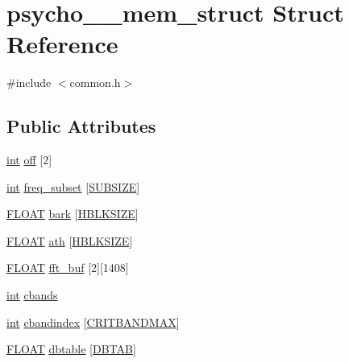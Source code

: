 \hypertarget{structpsycho__3__mem__struct}{}\section{psycho\+\_\+\_\+mem\+\_\+struct Struct Reference}
\label{structpsycho__3__mem__struct}


{\ttfamily \#include $<$common.\+h$>$}

\subsection*{Public Attributes}
\begin{DoxyCompactItemize}
\item 
\hyperlink{xmltok_8h_a5a0d4a5641ce434f1d23533f2b2e6653}{int} \hyperlink{structpsycho__3__mem__struct_acdb6dff0bf3ee7d04a3950b0173f5ff5}{off} \mbox{[}2\mbox{]}
\item 
\hyperlink{xmltok_8h_a5a0d4a5641ce434f1d23533f2b2e6653}{int} \hyperlink{structpsycho__3__mem__struct_ad1f171cd91c4a355096a36fa8a1fab97}{freq\+\_\+subset} \mbox{[}\hyperlink{twolame_2libtwolame_2common_8h_a13e3a47642545a9630ff3ef9e31c4521}{S\+U\+B\+S\+I\+ZE}\mbox{]}
\item 
\hyperlink{twolame_2libtwolame_2common_8h_ae8690abbffa85934d64d545920e2b108}{F\+L\+O\+AT} \hyperlink{structpsycho__3__mem__struct_a56c7889451c3574bfe6b1e77e9fbcc38}{bark} \mbox{[}\hyperlink{twolame_2libtwolame_2common_8h_a47a92e637e9159058c2f71d7c3999504}{H\+B\+L\+K\+S\+I\+ZE}\mbox{]}
\item 
\hyperlink{twolame_2libtwolame_2common_8h_ae8690abbffa85934d64d545920e2b108}{F\+L\+O\+AT} \hyperlink{structpsycho__3__mem__struct_adb99d8c4ffcf545625011df574e062bf}{ath} \mbox{[}\hyperlink{twolame_2libtwolame_2common_8h_a47a92e637e9159058c2f71d7c3999504}{H\+B\+L\+K\+S\+I\+ZE}\mbox{]}
\item 
\hyperlink{twolame_2libtwolame_2common_8h_ae8690abbffa85934d64d545920e2b108}{F\+L\+O\+AT} \hyperlink{structpsycho__3__mem__struct_a2371122a5a27f5f02b3e86701d4e43f9}{fft\+\_\+buf} \mbox{[}2\mbox{]}\mbox{[}1408\mbox{]}
\item 
\hyperlink{xmltok_8h_a5a0d4a5641ce434f1d23533f2b2e6653}{int} \hyperlink{structpsycho__3__mem__struct_aa44c1cab5f4660e0fe6398bfb27cb51b}{cbands}
\item 
\hyperlink{xmltok_8h_a5a0d4a5641ce434f1d23533f2b2e6653}{int} \hyperlink{structpsycho__3__mem__struct_a16a4ab0e46c2b4cbc2d61dd63f8285b3}{cbandindex} \mbox{[}\hyperlink{twolame_2libtwolame_2common_8h_a4b27b9b1dff4e446dd05112b6b940e5f}{C\+R\+I\+T\+B\+A\+N\+D\+M\+AX}\mbox{]}
\item 
\hyperlink{twolame_2libtwolame_2common_8h_ae8690abbffa85934d64d545920e2b108}{F\+L\+O\+AT} \hyperlink{structpsycho__3__mem__struct_a757825cf5dc16a8e8ce473fbf0081968}{dbtable} \mbox{[}\hyperlink{twolame_2libtwolame_2common_8h_a5b6a0dc416c04345a9ff28dce6948aff}{D\+B\+T\+AB}\mbox{]}
\end{DoxyCompactItemize}


